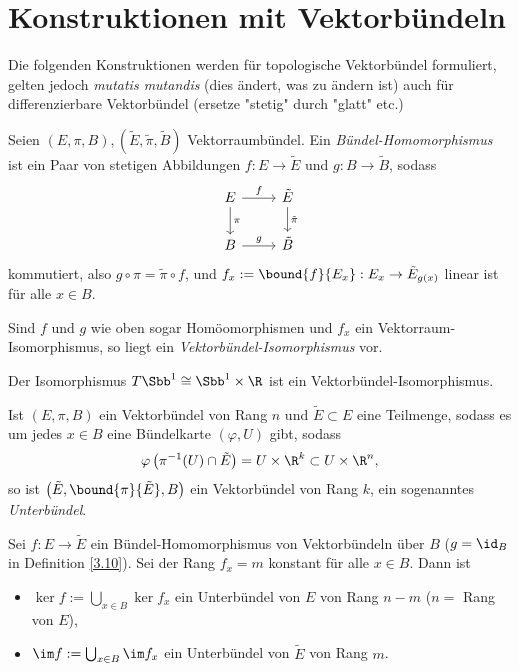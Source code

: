 \section{Konstruktionen mit Vektorbündeln}

\begin{rem}\lecture
	Die folgenden Konstruktionen werden für topologische Vektorbündel formuliert, gelten jedoch \emph{mutatis mutandis} (dies ändert, was zu ändern ist) auch für differenzierbare Vektorbündel (ersetze "stetig" durch "glatt" etc.)
\end{rem}

\begin{defn}\label{3.10}
	Seien $ (E,\pi,B),(\tilde{E},\tilde{\pi},\tilde{B}) $ Vektorraumbündel. Ein \emph{Bündel-Homomorphismus} ist ein Paar von stetigen Abbildungen $f: E \to \tilde{E}$ und $g: B \to \tilde{B}$, sodass
	\[ \begin{tikzcd}
		E \arrow{r}{f} \arrow{d}{\pi} & \tilde{E} \arrow{d}{\tilde{\pi}}\\
		B \arrow{r}{g} & \tilde{B}
	\end{tikzcd} \]
	kommutiert, also $g \circ \pi = \tilde{\pi} \circ f$, und $ f_x := \bound{f}{E_x}: E_x \to \tilde{E}_{g(x)} $ linear ist für alle $x \in B$.
\end{defn}

Sind $f$ und $g$ wie oben sogar Homöomorphismen und $f_x$ ein Vektorraum-Isomorphismus, so liegt ein \emph{Vektorbündel-Isomorphismus} vor.

\begin{exmp*}
	Der Isomorphismus $ T\Sbb^1 \cong \Sbb^1\times \R $ ist ein Vektorbündel-Isomorphismus.
\end{exmp*}

\begin{defn}[Unterbündel]
	Ist $ (E,\pi,B) $ ein Vektorbündel von Rang $n$ und $\tilde{E} \subset E$ eine Teilmenge, sodass es um jedes $x \in B$ eine Bündelkarte $(\varphi,U)$ gibt, sodass
	\[ \varphi \left(\pi^{-1}(U) \cap \tilde{E} \right) = U \times \R^k \subset U \times \R^n, \]
	so ist $ \left( \tilde{E}, \bound{\pi}{\tilde{E}},B \right) $ ein Vektorbündel von Rang $k$, ein sogenanntes \emph{Unterbündel}.
\end{defn}

\begin{lem}
	Sei $f: E \to \tilde{E}$ ein Bündel-Homomorphismus von Vektorbündeln über $B$ ($g = \id_B$ in Definition \ref{3.10}). Sei der Rang $f_x = m$ konstant für alle $x \in B$. Dann ist
	\begin{itemize}
		\item $ \ker f := \bigcup_{x \in B} \ker f_x $ ein Unterbündel von $E$ von Rang $n-m$ ($n = $ Rang von $E$),
		\item $ \im f := \bigcup_{x \in B} \im f_x $ ein Unterbündel von $\tilde{E}$ von Rang $m$.
	\end{itemize}
\end{lem}

